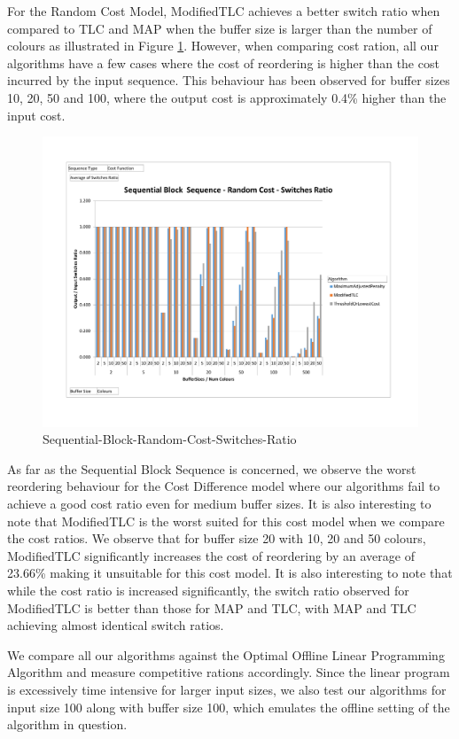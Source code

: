 For the Random Cost Model, ModifiedTLC achieves a better switch ratio when compared to TLC and MAP when the buffer size is larger than the number of colours as illustrated in Figure \ref{SequentialBlockRandomCostSwitches}. However, when comparing cost ration, all our algorithms have a few cases where the cost of reordering is higher than the cost incurred by the input sequence. This behaviour has been observed for buffer sizes 10, 20, 50 and 100, where the output cost is approximately 0.4\% higher than the input cost. 

\begin{figure}[ht]
\centering 
\includegraphics[scale=0.60]{Sequential-Block-Random-Cost-Switches.pdf}
\caption{Sequential-Block-Random-Cost-Switches-Ratio}
\label{SequentialBlockRandomCostSwitches}
\end{figure}

As far as the Sequential Block Sequence is concerned, we observe the worst reordering behaviour for the Cost Difference model where our algorithms fail to achieve a good cost ratio even for medium buffer sizes. It is also interesting to note that ModifiedTLC is the worst suited for this cost model when we compare the cost ratios. We observe that for buffer size 20 with 10, 20 and 50 colours, ModifiedTLC significantly increases the cost of reordering by an average of 23.66\% making it unsuitable for this cost model. It is also interesting to note that while the cost ratio is increased significantly, the switch ratio observed for ModifiedTLC is better than those for MAP and TLC, with MAP and TLC achieving almost identical switch ratios.  

We compare all our algorithms against the Optimal Offline Linear Programming Algorithm and measure competitive rations accordingly. Since the linear program is excessively time intensive for larger input sizes, we also test our algorithms for input size 100 along with buffer size 100, which emulates the offline setting of the algorithm in question.
